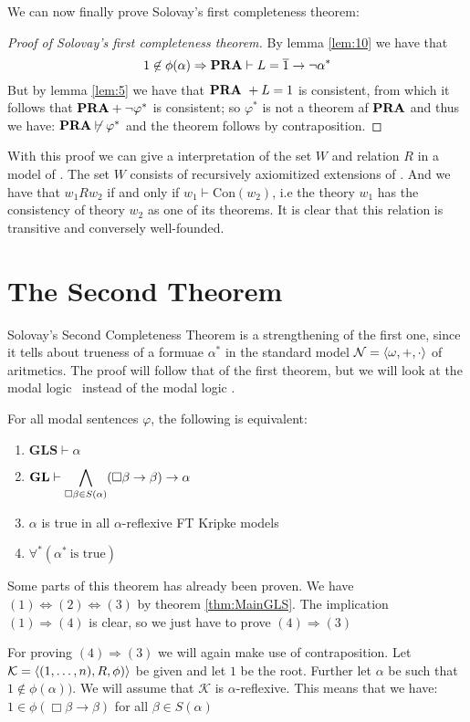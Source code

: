 \documentclass[../main.tex]{subfiles}
\begin{document}
We can now finally prove Solovay's first completeness theorem:
\begin{proof}[Proof of Solovay's first completeness theorem]
	By lemma \ref{lem:10} we have that
	$$1\not\in\phi(\alpha)\Rightarrow\text{\textbf{PRA}}\vdash L=\overline 1\rightarrow\neg\alpha^*$$
	But by lemma \ref{lem:5} we have that $\text{\textbf{PRA}}\ +L=1$ is consistent, from
	which it follows that $\text{\textbf{PRA}}+\neg\varphi^*$ is consistent; so $\varphi^*$
	is not a theorem af $\text{\textbf{PRA}}$ and thus we have:
	$\text{\textbf{PRA}}\not\vdash\varphi^*$ and the theorem follows by contraposition.
\end{proof}

With this proof we can give a interpretation of the set $W$ and relation $R$ in
a model of \GL. The set $W$ consists of recursively axiomitized extensions of
\PRA. And we have that $w_1Rw_2$ if and only if $w_1\vdash\text{Con}(w_2)$,
i.e the theory $w_1$ has the consistency of theory $w_2$ as one of its
theorems. It is clear that this relation is transitive and conversely
well-founded.
\section{The Second Theorem}
\label{chap:second}
Solovay's Second Completeness Theorem is a strengthening of the first one,
since it tells about trueness of a formuae $\alpha^*$ in the standard model
$\mathcal{N}=\langle
\omega,+,\cdot\rangle$ of aritmetics. The proof will follow that of the first
theorem, but we will look at the modal logic \GLS\ instead of the modal logic
\GL.
\begin{thm}
	For all modal sentences $\varphi$, the following is equivalent:
	\begin{enumerate}
		\item $\textbf{GLS}\vdash\alpha$
		\item $\text{\textbf{GL}}\vdash\displaystyle\bigwedge_{\Box \beta\in
			S(\alpha)}(\Box\beta\rightarrow\beta)\rightarrow\alpha$
		\item $\alpha$ is true in all $\alpha$-reflexive FT Kripke models
		\item $\forall^*(\alpha^*\ \text{is true})$
	\end{enumerate}
\end{thm}
Some parts of this theorem has already been proven. We have
$(1)\Leftrightarrow(2)\Leftrightarrow(3)$ by theorem \ref{thm:MainGLS}. The
implication $(1)\Rightarrow(4)$ is clear, so we just have to prove
$(4)\Rightarrow(3)$

For proving $(4)\Rightarrow(3)$ we will again make use of contraposition. Let
$\mathcal{K}=\langle(1,\ldots,n),R,\phi)\rangle$ be given and let $1$ be the root.
Further let $\alpha$ be such that $1\not\in\phi(\alpha))$.
We
will assume that $\mathcal{K}$ is $\alpha$-reflexive. This means that we have:
$1\in\phi(\Box\beta\rightarrow\beta)$ for all $\beta\in S(\alpha)$
\end{document}
